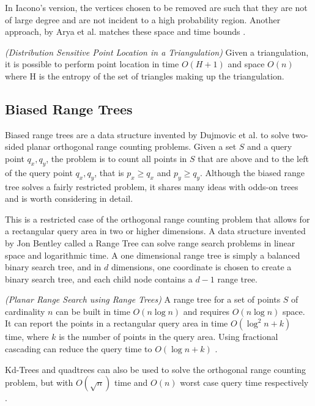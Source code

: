 \documentclass[mcs]{scsthesis}
\begin{document}
In Iacono's version, the vertices chosen to be removed are such that they are
not of large degree and are not incident to a high probability region. Another
approach, by Arya et al. matches these space and time bounds \cite{simpleentropy}.

\begin{thm} \emph{(Distribution Sensitive Point Location in a Triangulation)} 
Given a triangulation, it is possible to perform point location in time
\(O(H + 1)\) and space \(O(n)\) where H is the entropy of the set of triangles
making up the triangulation. 
\end{thm}

\subsection{Biased Range Trees}

Biased range trees are a data structure invented by Dujmovic et al.
\cite{biasedrange} to solve two-sided planar orthogonal range counting problems.
Given a set \(S\) and a query point \(q_x, q_y\), the problem is to count all
points in \(S\) that are above and to the left of the query point
\(q_x, q_y\), that is \(p_x \ge q_x\) and \(p_y \ge q_y\). Although the biased
range tree solves a fairly restricted problem, it shares many ideas with odds-on
trees and is worth considering in detail.

This is a restricted case of the orthogonal range counting problem that allows
for a rectangular query area in two or higher dimensions. A data structure
invented by Jon Bentley \cite{rangetree} called a Range Tree can solve range
search problems in linear space and logarithmic time. A one dimensional range
tree is simply a balanced binary search tree, and in \(d\) dimensions, one
coordinate is chosen to create a binary search tree, and each child node
contains a \(d - 1\) range tree. 

\begin{thm} \emph{(Planar Range Search using Range Trees)} 
A range tree for a set of points \(S\) of cardinality \(n\) can be built in
time \(O(n \log n)\) and requires \(O(n \log n)\) space. It can report the
points in a rectangular query area in time \(O(\log^2 n + k)\) time, where
\(k\) is the number of points in the query area. Using fractional cascading can
reduce the query time to \(O(\log n + k)\) \cite{dutch}. 
\end{thm}

Kd-Trees and quadtrees can also be used to solve the orthogonal range counting
problem, but with \(O(\sqrt n)\) time and \(O(n)\) worst case query time
respectively \cite{dutch}.
\end{document}
